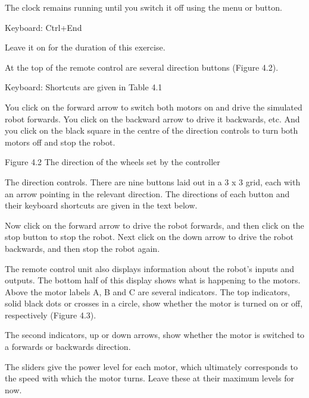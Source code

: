 \documentclass[letterpaper,10pt,english]{sphinxmanual}
\begin{document}
The clock remains running until you switch it off using the  menu or  button.





Keyboard: Ctrl+End





Leave it on for the duration of this exercise.

At the top of the remote control are several direction buttons (Figure 4.2).





Keyboard: Shortcuts are given in Table 4.1





You click on the forward arrow to switch both motors on and drive the simulated robot forwards. You click on the backward arrow to drive it backwards, etc. And you click on the black square in the centre of the direction controls to turn both motors off and stop the robot.


Figure 4.2 The direction of the wheels set by the controller

The direction controls. There are nine buttons laid out in a 3 x 3 grid, each with an arrow pointing in the relevant direction. The directions of each button and their keyboard shortcuts are given in the text below.

Now click on the forward arrow to drive the robot forwards, and then click on the stop button to stop the robot. Next click on the down arrow to drive the robot backwards, and then stop the robot again.

The remote control unit also displays information about the robot’s inputs and outputs. The bottom half of this display shows what is happening to the motors. Above the motor labels A, B and C are several indicators. The top indicators, solid black dots or crosses in a circle, show whether the motor is turned on or off, respectively (Figure 4.3).

The second indicators, up or down arrows, show whether the motor is switched to a forwards or backwards direction.

The sliders give the power level for each motor, which ultimately corresponds to the speed with which the motor turns. Leave these at their maximum levels for now.
\end{document}
